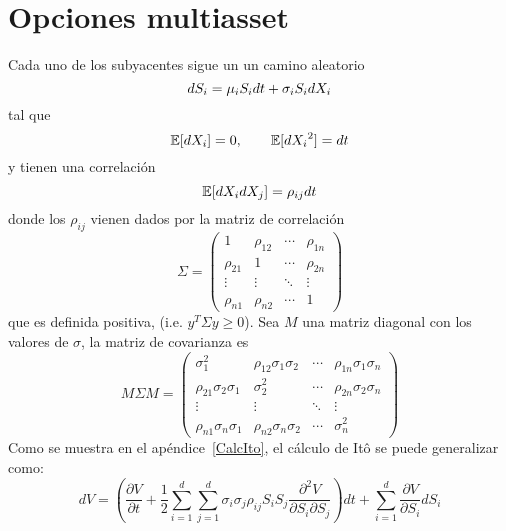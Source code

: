 \section{Opciones multiasset}
Cada uno de los subyacentes sigue un un camino aleatorio
\[
    dS_i = \mu_i S_i dt + \sigma_i S_i d\mathnormal{X_i}
\]
tal que
\[
    \mathbb{E}[d\mathnormal{X_i}] = 0, \qquad \mathbb{E}[d\mathnormal{X_i}^2] = dt
\]
y tienen una correlación
\[
    \mathbb{E}[d\mathnormal{X_i} d\mathnormal{X_j}] = \rho_{ij} dt
\]
donde los $\rho_{ij}$ vienen dados por la matriz de correlación
\[
    \Sigma = \begin{pmatrix}
        1 & \rho_{12} & \cdots & \rho_{1n} \\
        \rho_{21} & 1 & \cdots & \rho_{2n} \\
        \vdots & \vdots & \ddots & \vdots \\
        \rho_{n1} & \rho_{n2} & \cdots & 1
    \end{pmatrix}
\]
que es definida positiva, (i.e. $y^T \Sigma y \geq 0$). Sea $M$ una matriz diagonal con los valores de $\sigma$, la matriz de covarianza es
\[
    M \Sigma M = \begin{pmatrix}
        \sigma_1^2 & \rho_{12} \sigma_1 \sigma_2 & \cdots & \rho_{1n} \sigma_1 \sigma_n \\
        \rho_{21} \sigma_2 \sigma_1 & \sigma_2^2 & \cdots & \rho_{2n} \sigma_2 \sigma_n \\
        \vdots & \vdots & \ddots & \vdots \\
        \rho_{n1} \sigma_n \sigma_1 & \rho_{n2} \sigma_n \sigma_2 & \cdots & \sigma_n^2
    \end{pmatrix}
\]
Como se muestra en el apéndice~\ref{CalcIto}, el cálculo de Itô se puede generalizar como:
\[
    dV = \left( \frac{\partial V}{\partial t} + \frac{1}{2} \sum_{i=1}^{d} \sum_{j=1}^{d} \sigma_i \sigma_j \rho_{ij} S_i S_j \frac{\partial^2 V}{\partial S_i \partial S_j} \right) dt + \sum_{i=1}^{d} \frac{\partial V}{\partial S_i} dS_i
\]






